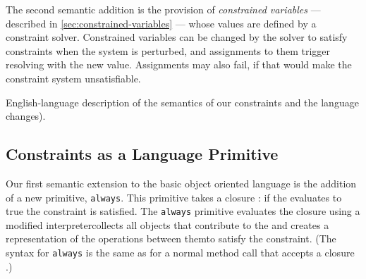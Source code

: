 The second semantic addition is the provision of
\emph{constrained variables} ---
described in \autoref{sec:constrained-variables} --- whose values are
defined by a constraint solver. Constrained variables can be changed
by the solver to satisfy constraints when the system is perturbed, and
assignments to them trigger resolving with the new value. Assignments
may also fail, if that would make the constraint system unsatisfiable.

\DIFdelbegin {}\DIFdelend \DIFaddbegin {}\DIFaddend English-language description of the
semantics of our constraints and the language changes\DIFdelbegin {}\DIFdelend \DIFaddbegin {}\DIFaddend ).

\subsection{Constraints as a Language Primitive}
\label{sec:constr-constr-always}
Our first semantic extension to the basic object oriented language is
the addition of a new primitive, \lstinline{always}. This primitive
takes a closure \DIFdelbegin {}\DIFdelend \DIFaddbegin {}\DIFaddend : if the \DIFdelbegin {}\DIFdelend \DIFaddbegin {}\DIFaddend evaluates to true the constraint is satisfied.  \DIFaddbegin {}\DIFaddend The \lstinline{always} primitive evaluates
the closure using a modified interpreter\DIFdelbegin {}\DIFdelend \DIFaddbegin {}\DIFaddend collects
all objects that contribute to the \DIFdelbegin {}\DIFdelend \DIFaddbegin {}\DIFaddend and creates a
representation of the operations between them\DIFdelbegin {}\DIFdelend \DIFaddbegin {}\DIFaddend to satisfy the constraint. (The syntax for
\lstinline{always} is the same as for a normal method call that
accepts a closure \DIFdelbegin {}%
\DIFdelend \DIFaddbegin {}\DIFaddend .)

